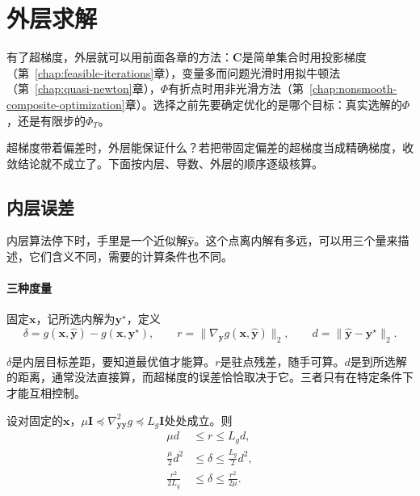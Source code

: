 \section{外层求解}
\label{sec:bilevel-outer}

有了超梯度，外层就可以用前面各章的方法：$\bm{C}$是简单集合时用投影梯度（第~\ref{chap:feasible-iterations}章），变量多而问题光滑时用拟牛顿法（第~\ref{chap:quasi-newton}章），$\Phi$有折点时用非光滑方法（第~\ref{chap:nonsmooth-composite-optimization}章）。选择之前先要确定优化的是哪个目标：真实选解的$\Phi$，还是有限步的$\Phi_T$。

超梯度带着偏差时，外层能保证什么？若把带固定偏差的超梯度当成精确梯度，收敛结论就不成立了。下面按内层、导数、外层的顺序逐级核算。

\subsection{内层误差}
\label{sec:bilevel-inner-error}

内层算法停下时，手里是一个近似解$\hat{\bm{y}}$。这个点离内解有多远，可以用三个量来描述，它们含义不同，需要的计算条件也不同。

\paragraph{三种度量}
固定$\bm{x}$，记所选内解为$\bm{y}^\star$，定义
\[
 \delta=g(\bm{x},\hat{\bm{y}})-g(\bm{x},\bm{y}^\star),\qquad r=\lVert\nabla_{\bm{y}}g(\bm{x},\hat{\bm{y}})\rVert_2,\qquad d=\lVert\hat{\bm{y}}-\bm{y}^\star\rVert_2.
\]

$\delta$是内层目标差距，要知道最优值才能算。$r$是驻点残差，随手可算。$d$是到所选解的距离，通常没法直接算，而超梯度的误差恰恰取决于它。三者只有在特定条件下才能互相控制。

\begin{lemma}[强凸下的互控]
\label{lem:bilevel-inner-measures}
设对固定的$\bm{x}$，$\mu\bm{I}\preceq\nabla^2_{\bm{y}\bm{y}}g\preceq L_g\bm{I}$处处成立。则
\begin{align}
 \mu d&\leq r\leq L_gd,
 \label{eq:bilevel-inner-r}\\
 \frac{\mu}{2}d^2&\leq\delta\leq\frac{L_g}{2}d^2,
 \label{eq:bilevel-inner-delta}\\
 \frac{r^2}{2L_g}&\leq\delta\leq\frac{r^2}{2\mu}.
 \label{eq:bilevel-inner-pl}
\end{align}
\end{lemma}

